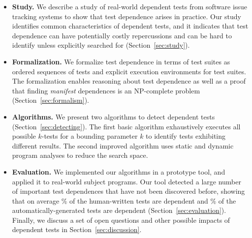 \begin{itemize}

  \item \textbf{Study.} We describe a study of \dtnum real-world
  dependent tests from \repnum software issue tracking
  systems to show that test dependence
  arises in practice. Our study identifies common
  characteristics of dependent tests, and
  it indicates that test dependence can have
  potentially costly repercussions and can be hard to identify unless
  explicitly searched for (Section~\ref{sec:study}).

\item \textbf{Formalization.} We formalize test dependence
  in terms of test suites as ordered sequences of tests and explicit execution
  environments for test suites.  The formalization enables reasoning about test dependence
  as well as a proof that finding \emph{manifest} dependences is an NP-complete
  problem (Section~\ref{sec:formalism}).

  \item \textbf{Algorithms.} We present two algorithms
  to detect dependent tests (Section~\ref{sec:detecting}). The first
  basic algorithm exhaustively executes all possible $k$-tests for
  a bounding parameter $k$ to identify tests exhibiting different results.
  The second improved algorithm uses static and dynamic program analyses
  to reduce the search space. 

  \item \textbf{Evaluation.} We implemented our algorithms in a prototype
  tool, and applied it to  real-world subject programs. Our
  tool detected a large number of important test dependences that have not
  been discovered before, showing that on average \% of the human-written
  tests are dependent and \% of the automatically-generated tests are dependent
   (Section~\ref{sec:evaluation}).
  Finally, we discuss a set of open questions and other possible impacts of dependent
  tests in Section~\ref{sec:discussion}.
\end{itemize}




